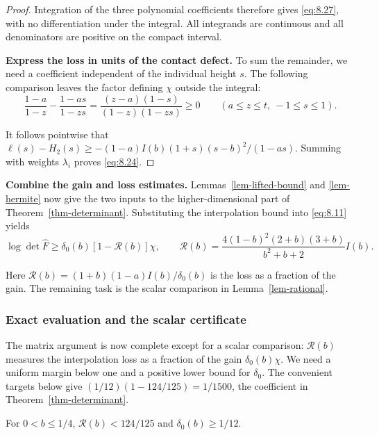 \begin{proof}
Integration of the three polynomial coefficients therefore gives \eqref{eq:8.27}, with
no differentiation under the integral. All integrands are continuous and all
denominators are positive on the compact interval.

\textbf{Express the loss in units of the contact defect.} To sum the remainder,
we need a coefficient independent of the individual height $s$. The following
comparison leaves the factor defining $\chi$ outside the integral:
\begin{equation}\label{eq:8.30}
\frac{1-a}{1-z}-\frac{1-as}{1-zs}
=\frac{(z-a)(1-s)}{(1-z)(1-zs)}\ge0
\qquad(a\le z\le t,\ -1\le s\le1).
\end{equation}

It follows pointwise that
$\ell(s)-H_2(s)\ge-(1-a)I(b)(1+s)(s-b)^2/(1-as)$.
Summing with weights $\lambda_i$ proves \eqref{eq:8.24}. 
\end{proof}

\textbf{Combine the gain and loss estimates.} Lemmas~\ref{lem-lifted-bound} and \ref{lem-hermite} now give the
two inputs to the higher-dimensional part of Theorem~\ref{thm-determinant}. Substituting the
interpolation bound into \eqref{eq:8.11} yields
\begin{equation}\label{eq:8.31}
\log\det\widehat F\ge\delta_0(b)[1-\mathcal R(b)]\chi,
\qquad
\mathcal R(b)=\frac{4(1-b)^2(2+b)(3+b)}{b^2+b+2}I(b).
\end{equation}

Here $\mathcal R(b)=(1+b)(1-a)I(b)/\delta_0(b)$ is the loss as a fraction of
the gain. The remaining task is the scalar comparison in Lemma~\ref{lem-rational}.

\subsubsection{Exact evaluation and the scalar certificate}\label{sec:8.2.3}

The matrix argument is now complete except for a scalar comparison:
$\mathcal R(b)$ measures the interpolation loss as a fraction of the gain
$\delta_0(b)\chi$. We need a uniform margin below one and a positive lower bound
for $\delta_0$. The convenient targets below give
$(1/12)(1-124/125)=1/1500$, the coefficient in Theorem~\ref{thm-determinant}.

\begin{lemma}\label{lem-rational}
For $0<b\le1/4$,
$\mathcal R(b)<124/125$ and $\delta_0(b)\ge1/12$.

\end{lemma}

